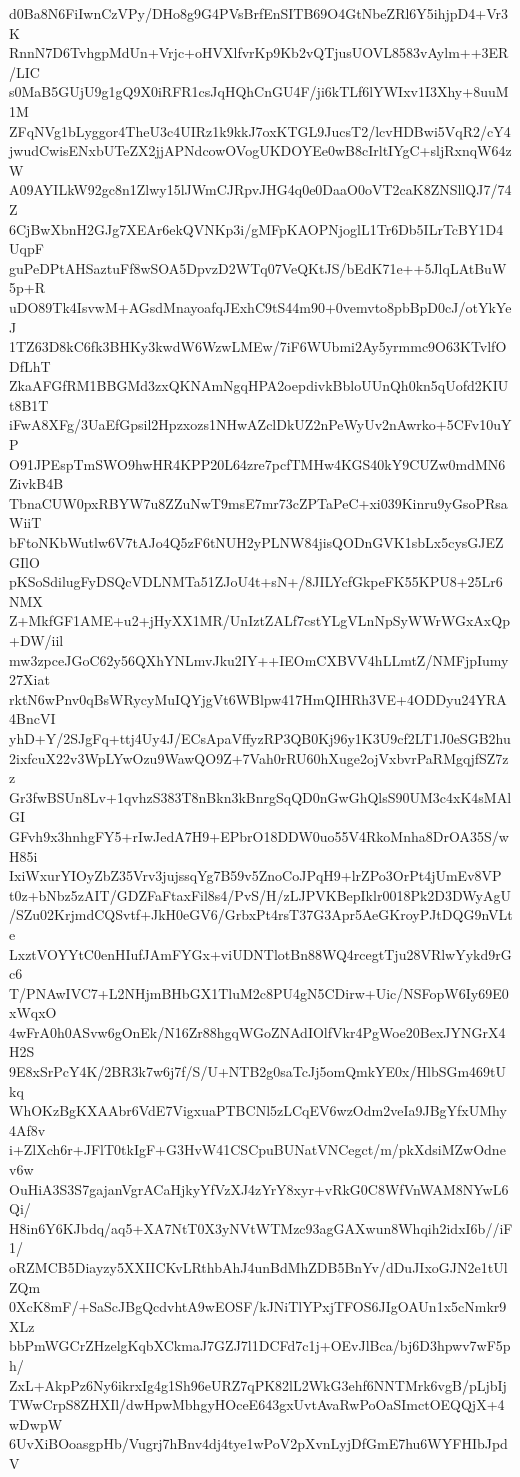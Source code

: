 d0Ba8N6FiIwnCzVPy/DHo8g9G4PVsBrfEnSITB69O4GtNbeZRl6Y5ihjpD4+Vr3K
RnnN7D6TvhgpMdUn+Vrjc+oHVXlfvrKp9Kb2vQTjusUOVL8583vAylm++3ER/LIC
s0MaB5GUjU9g1gQ9X0iRFR1csJqHQhCnGU4F/ji6kTLf6lYWIxv1I3Xhy+8uuM1M
ZFqNVg1bLyggor4TheU3c4UIRz1k9kkJ7oxKTGL9JucsT2/lcvHDBwi5VqR2/cY4
jwudCwisENxbUTeZX2jjAPNdcowOVogUKDOYEe0wB8cIrltIYgC+sljRxnqW64zW
A09AYILkW92gc8n1Zlwy15lJWmCJRpvJHG4q0e0DaaO0oVT2caK8ZNSllQJ7/74Z
6CjBwXbnH2GJg7XEAr6ekQVNKp3i/gMFpKAOPNjoglL1Tr6Db5ILrTcBY1D4UqpF
guPeDPtAHSaztuFf8wSOA5DpvzD2WTq07VeQKtJS/bEdK71e++5JlqLAtBuW5p+R
uDO89Tk4IsvwM+AGsdMnayoafqJExhC9tS44m90+0vemvto8pbBpD0cJ/otYkYeJ
1TZ63D8kC6fk3BHKy3kwdW6WzwLMEw/7iF6WUbmi2Ay5yrmmc9O63KTvlfODfLhT
ZkaAFGfRM1BBGMd3zxQKNAmNgqHPA2oepdivkBbloUUnQh0kn5qUofd2KIUt8B1T
iFwA8XFg/3UaEfGpsil2Hpzxozs1NHwAZclDkUZ2nPeWyUv2nAwrko+5CFv10uYP
O91JPEspTmSWO9hwHR4KPP20L64zre7pcfTMHw4KGS40kY9CUZw0mdMN6ZivkB4B
TbnaCUW0pxRBYW7u8ZZuNwT9msE7mr73cZPTaPeC+xi039Kinru9yGsoPRsaWiiT
bFtoNKbWutlw6V7tAJo4Q5zF6tNUH2yPLNW84jisQODnGVK1sbLx5cysGJEZGIlO
pKSoSdilugFyDSQcVDLNMTa51ZJoU4t+sN+/8JILYcfGkpeFK55KPU8+25Lr6NMX
Z+MkfGF1AME+u2+jHyXX1MR/UnIztZALf7cstYLgVLnNpSyWWrWGxAxQp+DW/iil
mw3zpceJGoC62y56QXhYNLmvJku2IY++IEOmCXBVV4hLLmtZ/NMFjpIumy27Xiat
rktN6wPnv0qBsWRycyMuIQYjgVt6WBlpw417HmQIHRh3VE+4ODDyu24YRA4BncVI
yhD+Y/2SJgFq+ttj4Uy4J/ECsApaVffyzRP3QB0Kj96y1K3U9cf2LT1J0eSGB2hu
2ixfcuX22v3WpLYwOzu9WawQO9Z+7Vah0rRU60hXuge2ojVxbvrPaRMgqjfSZ7zz
Gr3fwBSUn8Lv+1qvhzS383T8nBkn3kBnrgSqQD0nGwGhQlsS90UM3c4xK4sMAlGI
GFvh9x3hnhgFY5+rIwJedA7H9+EPbrO18DDW0uo55V4RkoMnha8DrOA35S/wH85i
IxiWxurYIOyZbZ35Vrv3jujssqYg7B59v5ZnoCoJPqH9+lrZPo3OrPt4jUmEv8VP
t0z+bNbz5zAIT/GDZFaFtaxFil8s4/PvS/H/zLJPVKBepIklr0018Pk2D3DWyAgU
/SZu02KrjmdCQSvtf+JkH0eGV6/GrbxPt4rsT37G3Apr5AeGKroyPJtDQG9nVLte
LxztVOYYtC0enHIufJAmFYGx+viUDNTlotBn88WQ4rcegtTju28VRlwYykd9rGc6
T/PNAwIVC7+L2NHjmBHbGX1TluM2c8PU4gN5CDirw+Uic/NSFopW6Iy69E0xWqxO
4wFrA0h0ASvw6gOnEk/N16Zr88hgqWGoZNAdIOlfVkr4PgWoe20BexJYNGrX4H2S
9E8xSrPcY4K/2BR3k7w6j7f/S/U+NTB2g0saTcJj5omQmkYE0x/HlbSGm469tUkq
WhOKzBgKXAAbr6VdE7VigxuaPTBCNl5zLCqEV6wzOdm2veIa9JBgYfxUMhy4Af8v
i+ZlXch6r+JFlT0tkIgF+G3HvW41CSCpuBUNatVNCegct/m/pkXdsiMZwOdnev6w
OuHiA3S3S7gajanVgrACaHjkyYfVzXJ4zYrY8xyr+vRkG0C8WfVnWAM8NYwL6Qi/
H8in6Y6KJbdq/aq5+XA7NtT0X3yNVtWTMzc93agGAXwun8Whqih2idxI6b//iF1/
oRZMCB5Diayzy5XXIICKvLRthbAhJ4unBdMhZDB5BnYv/dDuJIxoGJN2e1tUlZQm
0XcK8mF/+SaScJBgQcdvhtA9wEOSF/kJNiTlYPxjTFOS6JIgOAUn1x5cNmkr9XLz
bbPmWGCrZHzelgKqbXCkmaJ7GZJ7l1DCFd7c1j+OEvJlBca/bj6D3hpwv7wF5ph/
ZxL+AkpPz6Ny6ikrxIg4g1Sh96eURZ7qPK82lL2WkG3ehf6NNTMrk6vgB/pLjbIj
TWwCrpS8ZHXIl/dwHpwMbhgyHOceE643gxUvtAvaRwPoOaSImctOEQQjX+4wDwpW
6UvXiBOoasgpHb/Vugrj7hBnv4dj4tye1wPoV2pXvnLyjDfGmE7hu6WYFHIbJpdV
